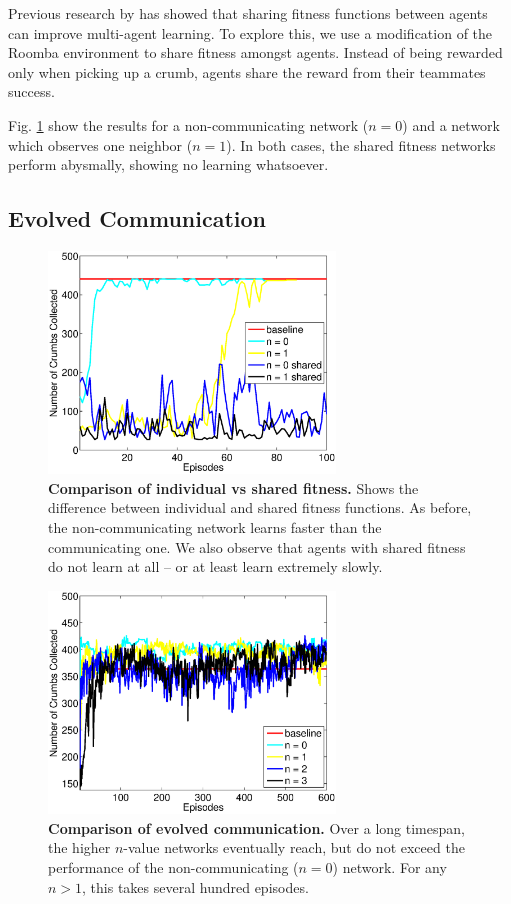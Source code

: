 \documentclass[conference]{IEEEtran}
\begin{document}
Previous research by \cite{rajagopalan2011role} has showed that sharing fitness functions between agents can improve multi-agent learning. 
To explore this, we use a modification of the Roomba environment to share fitness amongst agents. Instead of being rewarded only when picking up a crumb, agents share the reward from their teammates success. 

Fig. \ref{neroevolution:shared_fitness} show the results for a non-communicating network ($n=0$) and a network which observes one neighbor ($n=1$). In both cases, the shared fitness networks perform abysmally, showing no learning whatsoever.

\subsection{Evolved Communication}

\begin{figure}[b]
\centering
\includegraphics[width=3.0in]{./figures/neroevolution/shared_result.eps}
\caption{\textbf{Comparison of individual vs shared fitness.} Shows the difference between individual and shared fitness functions. As before, the non-communicating network learns faster than the communicating one. We also observe that agents with shared fitness do not learn at all -- or at least learn extremely slowly.}
\label{neroevolution:shared_fitness}
\end{figure}

\begin{figure}[b]
\centering
\includegraphics[width=3.0in]{./figures/neroevolution/emerg.eps}
\caption{\textbf{Comparison of evolved communication.} Over a long timespan, the higher $n$-value networks eventually reach, but do not exceed the performance of the non-communicating ($n=0$) network. For any $n>1$, this takes several hundred episodes. }
\label{neroevolution:evolved_comunication_results}
\end{figure}
\end{document}
